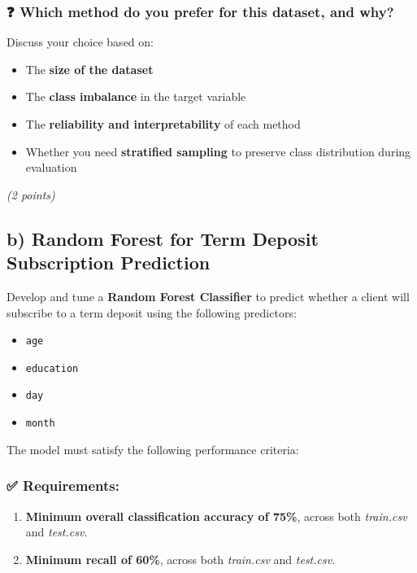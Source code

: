 \documentclass[
  letterpaper,
  DIV=11,
  numbers=noendperiod]{scrreprt}
\providecommand{\tightlist}{%
  \setlength{\itemsep}{0pt}\setlength{\parskip}{0pt}}\usepackage{longtable,booktabs,array}
\begin{document}
\subsubsection{❓ Which method do you prefer for this dataset, and
why?}\label{which-method-do-you-prefer-for-this-dataset-and-why}

Discuss your choice based on:

\begin{itemize}
\tightlist
\item
  The \textbf{size of the dataset}
\item
  The \textbf{class imbalance} in the target variable
\item
  The \textbf{reliability and interpretability} of each method
\item
  Whether you need \textbf{stratified sampling} to preserve class
  distribution during evaluation
\end{itemize}

\emph{(2 points)}

\subsection{b) Random Forest for Term Deposit Subscription
Prediction}\label{b-random-forest-for-term-deposit-subscription-prediction}

Develop and tune a \textbf{Random Forest Classifier} to predict whether
a client will subscribe to a term deposit using the following
predictors:

\begin{itemize}
\tightlist
\item
  \texttt{age}
\item
  \texttt{education}
\item
  \texttt{day}
\item
  \texttt{month}
\end{itemize}

The model must satisfy the following performance criteria:

\subsubsection{✅ Requirements:}\label{requirements-1}

\begin{enumerate}
\def\labelenumi{\arabic{enumi}.}
\tightlist
\item
  \textbf{Minimum overall classification accuracy of 75\%}, across both
  \emph{train.csv} and \emph{test.csv}.
\item
  \textbf{Minimum recall of 60\%}, across both \emph{train.csv} and
  \emph{test.csv}.
\end{enumerate}
\end{document}
